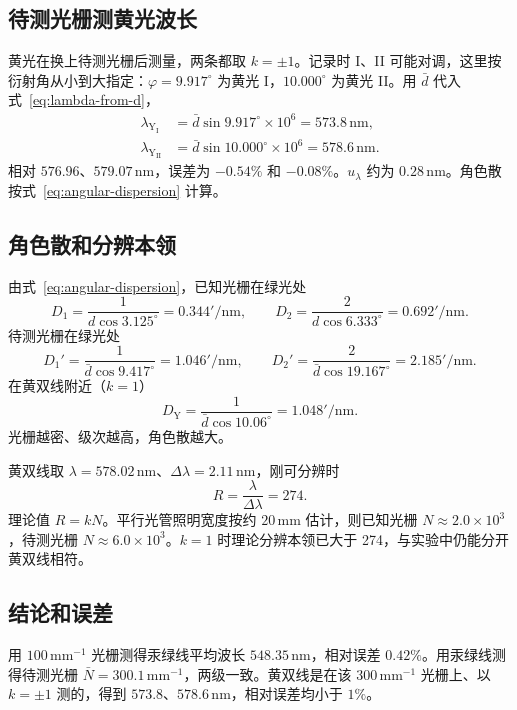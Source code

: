 \documentclass{../template/myrpt}
\begin{document}
\subsection{待测光栅测黄光波长}

黄光在换上待测光栅后测量，两条都取 $k=\pm1$。记录时 I、II 可能对调，这里按衍射角从小到大指定：$\varphi=9.917^\circ$ 为黄光 I，$10.000^\circ$ 为黄光 II。用 $\bar d$ 代入式~\eqref{eq:lambda-from-d}，
\begin{align*}
  \lambda_{\mathrm{Y_I}}
  &=\bar d\sin 9.917^\circ\times10^{6}
  =573.8\,\si{\nano\metre},\\
  \lambda_{\mathrm{Y_{II}}}
  &=\bar d\sin 10.000^\circ\times10^{6}
  =578.6\,\si{\nano\metre}.
\end{align*}
相对 $576.96$、$579.07\,\si{\nano\metre}$，误差为 $-0.54\%$ 和 $-0.08\%$。$u_\lambda$ 约为 $0.28\,\si{\nano\metre}$。角色散按式~\eqref{eq:angular-dispersion} 计算。

\subsection{角色散和分辨本领}

由式~\eqref{eq:angular-dispersion}，已知光栅在绿光处
\[
  D_1=\frac{1}{d\cos 3.125^\circ}=0.344'/\si{\nano\metre},\qquad
  D_2=\frac{2}{d\cos 6.333^\circ}=0.692'/\si{\nano\metre}.
\]
待测光栅在绿光处
\[
  D_1'=\frac{1}{\bar d\cos 9.417^\circ}=1.046'/\si{\nano\metre},\qquad
  D_2'=\frac{2}{\bar d\cos 19.167^\circ}=2.185'/\si{\nano\metre}.
\]
在黄双线附近（$k=1$）
\[
  D_{\mathrm{Y}}=\frac{1}{\bar d\cos 10.06^\circ}=1.048'/\si{\nano\metre}.
\]
光栅越密、级次越高，角色散越大。

黄双线取 $\lambda=578.02\,\si{\nano\metre}$、$\Delta\lambda=2.11\,\si{\nano\metre}$，刚可分辨时
\[
  R=\frac{\lambda}{\Delta\lambda}=274.
\]
理论值 $R=kN$。平行光管照明宽度按约 $20\,\si{\milli\metre}$ 估计，则已知光栅 $N\approx2.0\times10^{3}$，待测光栅 $N\approx6.0\times10^{3}$。$k=1$ 时理论分辨本领已大于 274，与实验中仍能分开黄双线相符。

\subsection{结论和误差}

用 $100\,\mathrm{mm}^{-1}$ 光栅测得汞绿线平均波长 $548.35\,\si{\nano\metre}$，相对误差 $0.42\%$。用汞绿线测得待测光栅 $\bar N=300.1\,\mathrm{mm}^{-1}$，两级一致。黄双线是在该 $300\,\mathrm{mm}^{-1}$ 光栅上、以 $k=\pm1$ 测的，得到 $573.8$、$578.6\,\si{\nano\metre}$，相对误差均小于 $1\%$。
\end{document}

